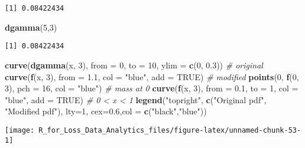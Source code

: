 \documentclass[]{book}
\newenvironment{Shaded}{\begin{snugshade}}{\end{snugshade}}
\newcommand{\KeywordTok}[1]{\textcolor[rgb]{0.13,0.29,0.53}{\textbf{#1}}}
\newcommand{\DataTypeTok}[1]{\textcolor[rgb]{0.13,0.29,0.53}{#1}}
\newcommand{\DecValTok}[1]{\textcolor[rgb]{0.00,0.00,0.81}{#1}}
\newcommand{\FloatTok}[1]{\textcolor[rgb]{0.00,0.00,0.81}{#1}}
\newcommand{\StringTok}[1]{\textcolor[rgb]{0.31,0.60,0.02}{#1}}
\newcommand{\CommentTok}[1]{\textcolor[rgb]{0.56,0.35,0.01}{\textit{#1}}}
\newcommand{\OtherTok}[1]{\textcolor[rgb]{0.56,0.35,0.01}{#1}}
\newcommand{\NormalTok}[1]{#1}
\theoremstyle{definition}
\theoremstyle{definition}
\theoremstyle{definition}
\theoremstyle{remark}
\begin{document}
\begin{verbatim}
[1] 0.08422434
\end{verbatim}

\begin{Shaded}
\begin{Highlighting}[]
\KeywordTok{dgamma}\NormalTok{(}\DecValTok{5}\NormalTok{,}\DecValTok{3}\NormalTok{)}
\end{Highlighting}
\end{Shaded}

\begin{verbatim}
[1] 0.08422434
\end{verbatim}

\begin{Shaded}
\begin{Highlighting}[]
\KeywordTok{curve}\NormalTok{(}\KeywordTok{dgamma}\NormalTok{(x, }\DecValTok{3}\NormalTok{), }\DataTypeTok{from =} \DecValTok{0}\NormalTok{, }\DataTypeTok{to =} \DecValTok{10}\NormalTok{, }\DataTypeTok{ylim =} \KeywordTok{c}\NormalTok{(}\DecValTok{0}\NormalTok{, }\FloatTok{0.3}\NormalTok{)) }\CommentTok{# original}
\KeywordTok{curve}\NormalTok{(}\KeywordTok{f}\NormalTok{(x, }\DecValTok{3}\NormalTok{), }\DataTypeTok{from =} \FloatTok{1.1}\NormalTok{, }\DataTypeTok{col =} \StringTok{"blue"}\NormalTok{, }\DataTypeTok{add =} \OtherTok{TRUE}\NormalTok{) }\CommentTok{# modified}
\KeywordTok{points}\NormalTok{(}\DecValTok{0}\NormalTok{, }\KeywordTok{f}\NormalTok{(}\DecValTok{0}\NormalTok{, }\DecValTok{3}\NormalTok{), }\DataTypeTok{pch =} \DecValTok{16}\NormalTok{, }\DataTypeTok{col =} \StringTok{"blue"}\NormalTok{) }\CommentTok{# mass at 0}
\KeywordTok{curve}\NormalTok{(}\KeywordTok{f}\NormalTok{(x, }\DecValTok{3}\NormalTok{), }\DataTypeTok{from =} \FloatTok{0.1}\NormalTok{, }\DataTypeTok{to =} \DecValTok{1}\NormalTok{, }\DataTypeTok{col =} \StringTok{"blue"}\NormalTok{, }\DataTypeTok{add =} \OtherTok{TRUE}\NormalTok{) }\CommentTok{# 0 < x < 1}
\KeywordTok{legend}\NormalTok{(}\StringTok{"topright"}\NormalTok{, }\KeywordTok{c}\NormalTok{(}\StringTok{"Original pdf"}\NormalTok{, }\StringTok{"Modified pdf"}\NormalTok{), }\DataTypeTok{lty=}\DecValTok{1}\NormalTok{, }\DataTypeTok{cex=}\FloatTok{0.6}\NormalTok{,}\DataTypeTok{col =} \KeywordTok{c}\NormalTok{(}\StringTok{"black"}\NormalTok{,}\StringTok{"blue"}\NormalTok{))}
\end{Highlighting}
\end{Shaded}

\begin{center}\texttt{[image: R\_for\_Loss\_Data\_Analytics\_files/figure-latex/unnamed-chunk-53-1]} \end{center}
\end{document}
